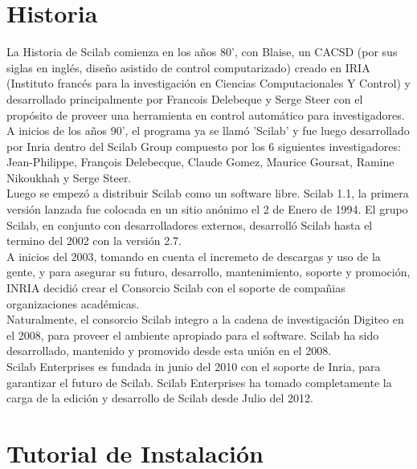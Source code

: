 \documentclass[11pt]{article} %
\begin{document}
\section{Historia}
La Historia de Scilab comienza en los años 80', con Blaise, un CACSD (por sus siglas en inglés, diseño asistido de control computarizado) creado en IRIA (Instituto francés para la investigación en Ciencias Computacionales Y Control) y desarrollado principalmente por Francois Delebeque y Serge Steer con el propósito de proveer una herramienta en control automático para investigadores.
\\%
A inicios de los años 90', el programa ya se llamó 'Scilab' y fue luego desarrollado por Inria dentro del Scilab Group compuesto por los 6 siguientes investigadores: Jean-Philippe, François Delebecque, Claude Gomez, Maurice Goursat, Ramine Nikoukhah y Serge Steer.
\\%
Luego se empezó a distribuir Scilab como un software libre. Scilab 1.1, la primera versión lanzada fue colocada en un sitio anónimo el 2 de Enero de 1994. El grupo Scilab, en conjunto con desarrolladores externos, desarrolló Scilab hasta el termino del 2002 con la versión 2.7.
\\%
A inicios del 2003, tomando en cuenta el incremeto de descargas y uso de la gente, y para asegurar su futuro, desarrollo, mantenimiento, soporte y promoción, INRIA decidió crear el Consorcio Scilab  con el soporte de compañias organizaciones académicas.
\\%
Naturalmente, el consorcio Scilab integro a la cadena de investigación Digiteo en el 2008, para proveer el ambiente apropiado para el software. Scilab ha sido desarrollado, mantenido y promovido desde esta unión en el 2008. 
\\%
Scilab Enterprises es fundada in junio del 2010 con el soporte de Inria, para garantizar el futuro de Scilab. Scilab Enterprises ha tomado completamente la carga de la edición y desarrollo de Scilab desde Julio del 2012.
\section{Tutorial de Instalación}
\end{document}
